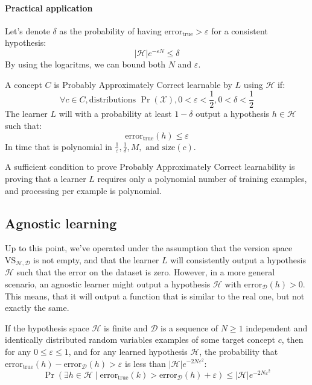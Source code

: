\paragraph*{Practical application}
Let's denote $\delta$ as the probability of having $\text{error}_{\text{true}}>\varepsilon$ for a consistent hypothesis:
\[\left\lvert \mathcal{H}\right\rvert e^{-\varepsilon N} \leq \delta\]
By using the logaritms, we can bound both $N$ and $\varepsilon$. 

\begin{definition}
    A concept $C$ is Probably Approximately Correct learnable by $L$ using $\mathcal{H}$ if: 
    \[\forall c\in C, \text{distributions }\Pr(\mathcal{X}), 0 < \varepsilon < \frac{1}{2},  0 < \delta < \frac{1}{2}\]
    The learner $L$ will with a probability at least $1 - \delta$ output a hypothesis $h \in \mathcal{H}$ such that:
    \[\text{error}_{\text{true}}(h) \leq \varepsilon\] 
    In time that is polynomial in $\frac{1}{\varepsilon}, \frac{1}{\delta}, M, \text{ and }\text{size}(c)$.
\end{definition}
A sufficient condition to prove Probably Approximately Correct learnability is proving that a learner $L$ requires only a polynomial number of training examples, and processing per example is polynomial.

\subsection{Agnostic learning}
Up to this point, we've operated under the assumption that the version space $\text{VS}_{\mathcal{H},\mathcal{D}}$ is not empty, and that the learner $L$ will consistently output a hypothesis $\mathcal{H}$ such that the error on the dataset is zero. 
However, in a more general scenario, an agnostic learner might output a hypothesis $\mathcal{H}$ with $\text{error}_{\mathcal{D}}(h) > 0$.
This means, that it will output a function that is similar to the real one, but not exactly the same. 
\begin{theorem}
    If the hypothesis space $\mathcal{H}$ is finite and $\mathcal{D}$ is a sequence of $N\geq 1$ independent and identically distributed random variables examples of some target concept $c$, then for any $0 \leq \varepsilon \leq 1$, and for any learned hypothesis $\mathcal{H}$, the probability that $\text{error}_{\text{true}}(h) - \text{error}_{\mathcal{D}}(h) > \varepsilon$ is less than $\left\lvert \mathcal{H}\right\rvert e^{-2N\varepsilon^2}$:
    \[\Pr(\exists h\in \mathcal{H}\mid\text{error}_{\text{true}}(k)>\text{error}_{\mathcal{D}}(h)+\varepsilon)\leq \left\lvert \mathcal{H}\right\rvert e^{-2N\varepsilon^2}\]
\end{theorem}

